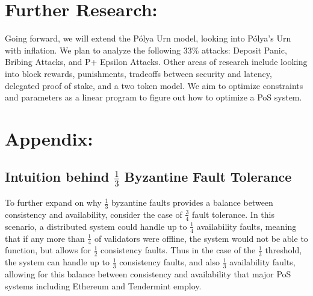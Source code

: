 \documentclass{article}
\renewcommand{\|}{\;|\;}
\begin{document}
\section{Further Research:}
Going forward, we will extend the P\'olya Urn model, looking into P\'olya's Urn with inflation. We plan to analyze the following 33\% attacks: Deposit Panic, Bribing Attacks, and P+ Epsilon Attacks. Other areas of research include looking into block rewards, punishments, tradeoffs between security and latency, delegated proof of stake, and a two token model. We aim to optimize constraints and parameters as a linear program to figure out how to optimize a PoS system.

\section{Appendix:}
\subsection{Intuition behind $\frac{1}{3}$ Byzantine Fault Tolerance}
To further expand on why $\frac{1}{3}$ byzantine faults provides a balance between consistency and availability, consider the case of $\frac{3}{4}$ fault tolerance. In this scenario, a distributed system could handle up to $\frac{1}{4}$ availability faults, meaning that if any more than $\frac{1}{4}$ of validators were offline, the system would not be able to function, but allows for $\frac{1}{2}$ consistency faults. Thus in the case of the $\frac{1}{3}$ threshold, the system can handle up to $\frac{1}{3}$ consistency faults, and also $\frac{1}{3}$ availability faults, allowing for this balance between consistency and availability that major PoS systems including Ethereum and Tendermint employ.


\newline
\newpage
\printbibliography

\clearpage
\end{document}
